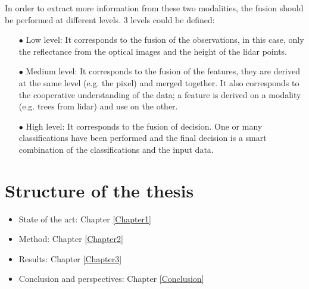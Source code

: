 In order to extract more information from these two modalities, the fusion should be performed at different levels. 3 levels could be defined:
\begin{itemize}
\item[$\bullet$] Low level: It corresponds to the fusion of the observations, in this case, only the reflectance from the optical images and the height of the lidar points.
\item[$\bullet$] Medium level: It corresponds to the fusion of the features, they are derived at the same level (e.g. the pixel) and merged together. It also corresponds to the cooperative understanding of the data; a feature is derived on a modality (e.g. trees from lidar) and use on the other.
\item[$\bullet$] High level: It corresponds to the fusion of decision. One or many classifications have been performed and the final decision is a smart combination of the classifications and the input data.
\end{itemize}

\section{Structure of the thesis}

\begin{itemize}
\item State of the art: Chapter \ref{Chapter1}
\item Method: Chapter \ref{Chapter2}
\item Results: Chapter \ref{Chapter3}
\item Conclusion and perspectives: Chapter \ref{Conclusion}
\end{itemize}

\stopcontents[chapters]
